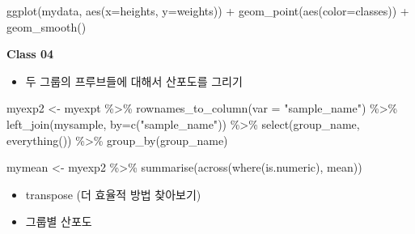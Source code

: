 \documentclass[
]{book}
\newenvironment{Shaded}{\begin{snugshade}}{\end{snugshade}}
\newcommand{\AttributeTok}[1]{\textcolor[rgb]{0.77,0.63,0.00}{#1}}
\newcommand{\FunctionTok}[1]{\textcolor[rgb]{0.00,0.00,0.00}{#1}}
\newcommand{\NormalTok}[1]{#1}
\newcommand{\OtherTok}[1]{\textcolor[rgb]{0.56,0.35,0.01}{#1}}
\newcommand{\SpecialCharTok}[1]{\textcolor[rgb]{0.00,0.00,0.00}{#1}}
\newcommand{\StringTok}[1]{\textcolor[rgb]{0.31,0.60,0.02}{#1}}
\providecommand{\tightlist}{%
  \setlength{\itemsep}{0pt}\setlength{\parskip}{0pt}}
\begin{document}
\begin{Shaded}
\begin{Highlighting}[]

\FunctionTok{ggplot}\NormalTok{(mydata, }\FunctionTok{aes}\NormalTok{(}\AttributeTok{x=}\NormalTok{heights, }\AttributeTok{y=}\NormalTok{weights)) }\SpecialCharTok{+}
  \FunctionTok{geom\_point}\NormalTok{(}\FunctionTok{aes}\NormalTok{(}\AttributeTok{color=}\NormalTok{classes)) }\SpecialCharTok{+}
  \FunctionTok{geom\_smooth}\NormalTok{()}
\end{Highlighting}
\end{Shaded}

\textbf{Class 04}

\begin{itemize}
\tightlist
\item
  두 그룹의 프루브들에 대해서 산포도를 그리기
\end{itemize}

\begin{Shaded}
\begin{Highlighting}[]
\NormalTok{myexp2 }\OtherTok{\textless{}{-}}\NormalTok{ myexpt }\SpecialCharTok{\%\textgreater{}\%} 
  \FunctionTok{rownames\_to\_column}\NormalTok{(}\AttributeTok{var =} \StringTok{"sample\_name"}\NormalTok{) }\SpecialCharTok{\%\textgreater{}\%} 
  \FunctionTok{left\_join}\NormalTok{(mysample, }\AttributeTok{by=}\FunctionTok{c}\NormalTok{(}\StringTok{"sample\_name"}\NormalTok{)) }\SpecialCharTok{\%\textgreater{}\%} 
  \FunctionTok{select}\NormalTok{(group\_name, }\FunctionTok{everything}\NormalTok{()) }\SpecialCharTok{\%\textgreater{}\%} 
  \FunctionTok{group\_by}\NormalTok{(group\_name)}

\NormalTok{mymean }\OtherTok{\textless{}{-}}\NormalTok{ myexp2 }\SpecialCharTok{\%\textgreater{}\%} 
  \FunctionTok{summarise}\NormalTok{(}\FunctionTok{across}\NormalTok{(}\FunctionTok{where}\NormalTok{(is.numeric), mean))}
\end{Highlighting}
\end{Shaded}

\begin{itemize}
\tightlist
\item
  transpose (더 효율적 방법 찾아보기)
\item
  그룹별 산포도
\end{itemize}
\end{document}
